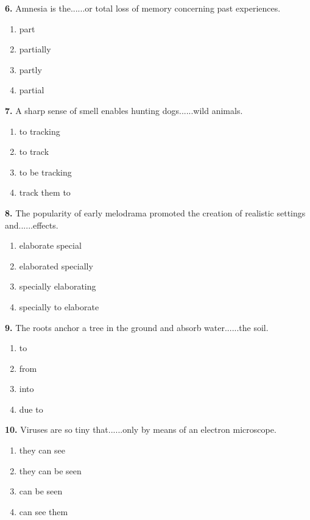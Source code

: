 \documentclass[12pt]{article}
\begin{document}
\par
\vspace{0.25\baselineskip}
\noindent\textbf{6.} Amnesia is the......or total loss of memory concerning past experiences.
\begin{enumerate}[label=(\Alph*),leftmargin=*,itemsep=0.2em]
\item part
\item partially
\item partly
\item partial
\end{enumerate}
\par
\vspace{0.25\baselineskip}
\noindent\textbf{7.} A sharp sense of smell enables hunting dogs......wild animals.
\begin{enumerate}[label=(\Alph*),leftmargin=*,itemsep=0.2em]
\item to tracking
\item to track
\item to be tracking
\item track them to
\end{enumerate}
\par
\vspace{0.25\baselineskip}
\noindent\textbf{8.} The popularity of early melodrama promoted the creation of realistic settings and......effects.
\begin{enumerate}[label=(\Alph*),leftmargin=*,itemsep=0.2em]
\item elaborate special
\item elaborated specially
\item specially elaborating
\item specially to elaborate
\end{enumerate}
\par
\vspace{0.25\baselineskip}
\noindent\textbf{9.} The roots anchor a tree in the ground and absorb water......the soil.
\begin{enumerate}[label=(\Alph*),leftmargin=*,itemsep=0.2em]
\item to
\item from
\item into
\item due to
\end{enumerate}
\par
\vspace{0.25\baselineskip}
\noindent\textbf{10.} Viruses are so tiny that......only by means of an electron microscope.
\begin{enumerate}[label=(\Alph*),leftmargin=*,itemsep=0.2em]
\item they can see
\item they can be seen
\item can be seen
\item can see them
\end{enumerate}
\end{document}
